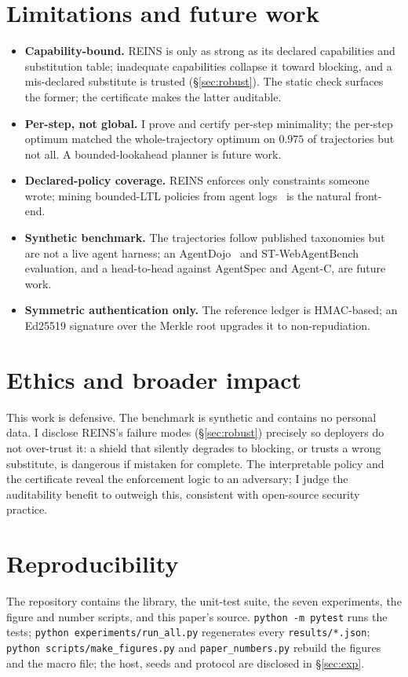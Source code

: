 \documentclass[11pt]{article}
\newcommand{\globalAgree}{0.975}\newcommand{\globalTraj}{480}\newcommand{\globalGap}{15.0}
\begin{document}
\section{Limitations and future work}
\label{sec:limits}
\begin{itemize}[leftmargin=1.4em,itemsep=1pt]
\item \textbf{Capability-bound.} REINS is only as strong as its declared
capabilities and substitution table; inadequate capabilities collapse it toward
blocking, and a mis-declared substitute is trusted (\S\ref{sec:robust}). The
static check surfaces the former; the certificate makes the latter auditable.
\item \textbf{Per-step, not global.} I prove and certify per-step minimality;
the per-step optimum matched the whole-trajectory optimum on $\globalAgree$ of
trajectories but not all. A bounded-lookahead planner is future work.
\item \textbf{Declared-policy coverage.} REINS enforces only constraints someone
wrote; mining bounded-LTL policies from agent logs~\citep{lemieux2015texada} is the
natural front-end.
\item \textbf{Synthetic benchmark.} The trajectories follow published taxonomies
but are not a live agent harness; an AgentDojo~\citep{debenedetti2024agentdojo}
and ST-WebAgentBench~\citep{levy2025stwebagentbench} evaluation, and a head-to-head
against AgentSpec and Agent-C, are future work.
\item \textbf{Symmetric authentication only.} The reference ledger is HMAC-based;
an Ed25519 signature over the Merkle root upgrades it to non-repudiation.
\end{itemize}

\section{Ethics and broader impact}
This work is defensive. The benchmark is synthetic and contains no personal data.
I disclose REINS's failure modes (\S\ref{sec:robust}) precisely so deployers do
not over-trust it: a shield that silently degrades to blocking, or trusts a wrong
substitute, is dangerous if mistaken for complete. The interpretable policy and
the certificate reveal the enforcement logic to an adversary; I judge the
auditability benefit to outweigh this, consistent with open-source security
practice.

\section{Reproducibility}
The repository contains the library, the unit-test suite, the seven experiments,
the figure and number scripts, and this paper's source. \texttt{python -m pytest}
runs the tests; \texttt{python experiments/run\_all.py} regenerates every
\texttt{results/*.json}; \texttt{python scripts/make\_figures.py} and
\texttt{paper\_numbers.py} rebuild the figures and the macro file; the host,
seeds and protocol are disclosed in \S\ref{sec:exp}.
\end{document}
